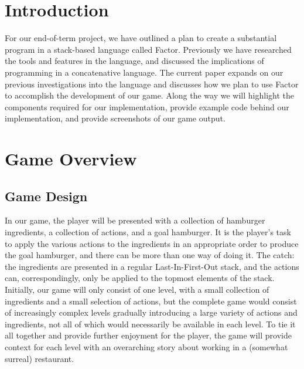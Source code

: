 \documentclass{sig-alternate}
\begin{document}



\section{Introduction} 
For our end-of-term project, we have outlined a plan to create a substantial program in a stack-based language called Factor. Previously we have researched the tools and features in the language, and discussed the implications of programming in a concatenative language. The current paper expands on our previous investigations into the language and discusses how we plan to use Factor to accomplish the development of our game. Along the way we will highlight the components required for our implementation, provide example code behind our implementation, and provide screenshots of our game output. 

\section{Game Overview}
\subsection{Game Design}
In our game, the player will be presented with a collection of hamburger ingredients, a collection of actions, and a goal hamburger. It is the player's task to apply the various actions to the ingredients in an appropriate order to produce the goal hamburger, and there can be more than one way of doing it. The catch: the ingredients are presented in a regular Last-In-First-Out stack, and the actions can, correspondingly, only be applied to the topmost elements of the stack. Initially, our game will only consist of one level, with a small collection of ingredients and a small selection of actions, but the complete game would consist of increasingly complex levels gradually introducing a large variety of actions and ingredients, not all of which would necessarily be available in each level. To tie it all together and provide further enjoyment for the player, the game will provide context for each level with an overarching story about working in a (somewhat surreal) restaurant.
\end{document}

